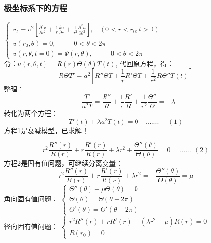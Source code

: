 \begin{frame}
	\frametitle{极坐标系下的方程}
	$\begin{cases}
		\displaystyle	u_t=a^2 [ {	\frac{\partial^2 u }{\partial r^2 } +\frac{1}{r } \frac{\partial u }{\partial r } +
		\frac{1}{r^2 } \frac{\partial ^2 u }{\partial \theta ^2
		} }], ~~~~ (0<r<r_0, t>0)\\
		u(r_0,\theta)=0,~~~~~~~~~~~~ 0<\theta <2\pi 	\\
		u(r,\theta,t =0)=\Psi(r,\theta) ,~~~~~~~~~~~~ 0<\theta <2\pi 	
	\end{cases} $\\
	令：$u(r,\theta,t) =R(r)\Theta(\theta)T(t)$,  代回原方程，得：
	\begin{equation*}
		R\Theta T'=a^2 [ R'' \Theta T + \dfrac{1}{r} R' \Theta T  + \dfrac{1}{r^2} R \Theta '' T(t)  ]
	\end{equation*}
	整理：
	\begin{equation*}
		-\frac{T'}{a^2T} =\frac{R''}{R}+\frac{1}{r} \frac{R'}{R} +\frac{1}{r^2} \frac{\Theta ''} {\Theta}  =-\lambda
	\end{equation*}
	转化为两个方程：
	\begin{equation*}
		T'(t)+\lambda a^2T(t)=0  ~~~~~....... ~~~~~~(1)
	\end{equation*}	
	方程1是衰减模型，已求解！\\
\end{frame}	

\begin{frame}
	\begin{equation*}
		r^2 \frac{R'' (r)}{R(r)}+r \frac{R'(r)}{R(r)} + \lambda r^2 +\frac{\Theta ''(\theta)} {\Theta (\theta)} =0  ~~~~~~......~~(2)
	\end{equation*}
	方程2是固有值问题，可继续分离变量：	
	\begin{equation*}
		r^2 \frac{R'' (r)}{R(r)}+r \frac{R'(r)}{R(r)} + \lambda r^2 =-\frac{\Theta ''(\theta)} {\Theta (\theta)} =\mu  
	\end{equation*}
	角向固有值问题：
	$ \begin{cases}
		\Theta ''(\theta)+\mu \Theta (\theta) =0 \\
		\Theta (\theta) =	\Theta (\theta+2\pi)  \\
		\Theta' (\theta) =	\Theta' (\theta+2\pi)  
	\end{cases} $\\	
	径向固有值问题：
	$ \begin{cases}
		r^2 R'' (r)+r R'(r) +( \lambda r^2 -\mu)R(r)=0  \\
		R(r_0)=0
	\end{cases} $\\	
\end{frame}	

